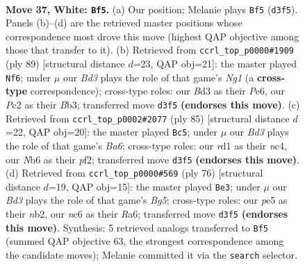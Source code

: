 \documentclass[11pt]{article}
\begin{document}
\clearpage

\begin{figure}[p]\centering
\begin{subfigure}{0.46\textwidth}\centering
\resizebox{\linewidth}{!}{%
\newchessgame
\chessboard[
  setfen={8/6k1/1Nn5/4p1p1/5p2/3B1P2/2P2K2/3r4 w - - 2 37},
  showmover=false,
  pgfstyle=straightmove, color=movearrow, markmove={d3-f5}
]}
\caption{}
\end{subfigure}\hfill
\begin{subfigure}{0.46\textwidth}\centering
\resizebox{\linewidth}{!}{%
\newchessgame
\chessboard[
  setfen={4R1n1/8/4p3/5p2/3K1k2/Pb5P/1P5P/8 b - - 9 45},
  showmover=false,
  pgfstyle=straightmove, color=movearrow, markmove={g8-f6}
]}
\caption{}
\end{subfigure}
\\[4pt]
\begin{subfigure}{0.46\textwidth}\centering
\resizebox{\linewidth}{!}{%
\newchessgame
\chessboard[
  setfen={6k1/5p2/6p1/7p/2N1K2P/b5P1/5P2/8 b - - 3 43},
  showmover=false,
  pgfstyle=straightmove, color=movearrow, markmove={a3-c5}
]}
\caption{}
\end{subfigure}\hfill
\begin{subfigure}{0.46\textwidth}\centering
\resizebox{\linewidth}{!}{%
\newchessgame
\chessboard[
  setfen={8/5p2/R3pP2/3r2BP/1kp5/6P1/1n4K1/8 w - - 1 39},
  showmover=false,
  pgfstyle=straightmove, color=movearrow, markmove={g5-e3}
]}
\caption{}
\end{subfigure}
\caption{\textbf{Move 37, White: \texttt{Bf5}.} (a) Our position; Melanie plays \texttt{Bf5} (\texttt{d3f5}). Panels (b)--(d) are the retrieved master positions whose correspondence most drove this move (highest QAP objective among those that transfer to it). (b) Retrieved from \texttt{ccrl\_top\_p0000\#1909} (ply 89) [structural distance $d$=23, QAP obj=21]: the master played \texttt{Nf6}; under $\mu$ our \emph{Bd3} plays the role of that game's \emph{Ng1} (a \textbf{cross-type} correspondence); cross-type roles: our \emph{B}d3 as their \emph{P}e6, our \emph{P}c2 as their \emph{B}b3; transferred move \texttt{d3f5} \textbf{(endorses this move)}. (c) Retrieved from \texttt{ccrl\_top\_p0002\#2077} (ply 85) [structural distance $d$=22, QAP obj=20]: the master played \texttt{Bc5}; under $\mu$ our \emph{Bd3} plays the role of that game's \emph{Ba6}; cross-type roles: our \emph{r}d1 as their \emph{n}c4, our \emph{N}b6 as their \emph{p}f2; transferred move \texttt{d3f5} \textbf{(endorses this move)}. (d) Retrieved from \texttt{ccrl\_top\_p0000\#569} (ply 76) [structural distance $d$=19, QAP obj=15]: the master played \texttt{Be3}; under $\mu$ our \emph{Bd3} plays the role of that game's \emph{Bg5}; cross-type roles: our \emph{p}e5 as their \emph{n}b2, our \emph{n}c6 as their \emph{R}a6; transferred move \texttt{d3f5} \textbf{(endorses this move)}. Synthesis: 5 retrieved analogs transferred to \texttt{Bf5} (summed QAP objective 63, the strongest correspondence among the candidate moves); Melanie committed it via the \texttt{search} selector.}
\label{fig:thought-m72}
\end{figure}
\end{document}
